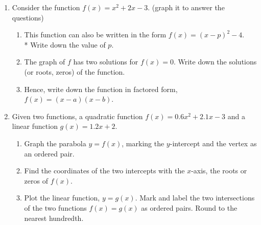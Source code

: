 \documentclass[12pt, twoside]{article}
\begin{document}
\begin{enumerate}
\item Consider the function $f(x)=x^2+2x-3$. (graph it to answer the questions)
\begin{enumerate}
    \item This function can also be written in the form $f(x)=(x-p)^2 -4$.\\* 
    Write down the value of $p$. \vspace{1.5cm}
    \item The graph of $f$ has two solutions for $f(x)=0$. Write down the solutions (or roots, zeros) of the function. \vspace{1.5cm}
    \item Hence, write down the function in factored form, $f(x)=(x-a)(x-b)$. \vspace{1.5cm}
\end{enumerate}

\newpage
\item Given two functions, a quadratic function $f(x)=0.6x^2+2.1x-3$ and a linear function $g(x)=1.2x+2$.
    \begin{enumerate}%
        \item Graph the parabola $y=f(x)$, marking the $y$-intercept and the vertex as an ordered pair.
        \item Find the coordinates of the two intercepts with the $x$-axis, the roots or zeros of $f(x)$.\vspace{1cm}
        \item Plot the linear function, $y=g(x)$. Mark and label the two intersections of the two functions $f(x)=g(x)$ as ordered pairs. Round to the nearest hundredth.
    \end{enumerate}
    \begin{center}
    \end{center}


\end{enumerate}
\end{document}
